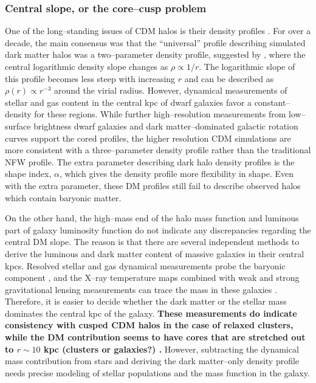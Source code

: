 \documentclass[paper=a4, fontsize=11pt]{scrartcl} %
\numberwithin{equation}{section} %
\numberwithin{figure}{section} %
\numberwithin{table}{section} %
\begin{document}
\subsubsection{Central slope, or the core--cusp problem}
\label{subsec:core-cusp}
One of the long--standing issues of CDM halos is their density profiles \citep[][]{Dubinski.Carlberg1991, Walker.Penarrubia2011}. For over a decade, the main consensus was that the ``universal'' profile describing simulated dark matter halos was a two--parameter density profile, suggested by \citet[][ hereafter NFW]{NFW}, where the central logarithmic density slope changes as $\rho \propto 1/r$. The logarithmic slope of this profile becomes less steep with increasing $r$ and can be described as $\rho(r) \propto r^{-3}$ around the virial radius. However, dynamical measurements of stellar and gas content in the central kpc of dwarf galaxies \citep[][]{} favor a constant--density for these regions. While further high--resolution measurements from low--surface brightness dwarf galaxies and dark matter--dominated galactic rotation curves support the cored profiles, the higher resolution CDM simulations are more consistent with a three--parameter density profile rather than the traditional NFW profile. The extra parameter describing dark halo density profiles is the shape index, $\alpha$, which gives the density profile more flexibility in shape. Even with the extra parameter, these DM profiles still fail to describe observed halos which contain baryonic matter. 

On the other hand, the high--mass end of the halo mass function and luminous part of galaxy luminosity function do not indicate any discrepancies regarding the central DM slope. The reason is that there are several independent methods to derive the luminous and dark matter content of massive galaxies in their central kpcs. Resolved stellar and gas dynamical measurements probe the baryonic component \citep[][]{}, and the X--ray temperature maps combined with weak and strong gravitational lensing measurements can trace the mass in these galaxies \citep[][]{}. Therefore, it is easier to decide whether the dark matter or the stellar mass dominates the central kpc of the galaxy. {\bf These measurements do indicate consistency with cusped CDM halos in the case of relaxed clusters, while the DM contribution seems to have cores that are stretched out to $r\sim 10$ kpc (clusters or galaxies?) \citep[][]{}.} %
 However, subtracting the dynamical mass contribution from stars and deriving the dark matter--only density profile needs precise modeling of stellar populations and the mass function in the galaxy. 
\end{document}
